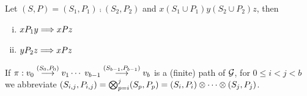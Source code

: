 \begin{lemma}\label{lem:P-lemma}
Let $(S,P) = (S_1,P_1)\comp (S_2,P_2)$ and $x (S_1 \cup P_1) y (S_2 \cup P_2) z$, then
\begin{enumerate}[i)]

\item
\label{lem:P-lemma-1} $x P_1 y \Longrightarrow x P z$

\item
\label{lem:P-lemma-2} $y P_2 z \Longrightarrow x P z$

\end{enumerate}
\end{lemma}

%

If $\pi: v_0 \stackrel{(S_0,P_0)}{\longrightarrow} v_1 \cdots \; v_{b-1} \stackrel{(S_{b-1},P_{b-1})}{\longrightarrow} v_{b}$ is a (finite) path of $\mathcal{G}$, for $0 \leq i < j < b$
we abbreviate $(S_{i,j}, P_{i,j}) = \bigotimes_{p = i}^{j} (S_p,P_p) = (S_i,P_i) \otimes \cdots \otimes (S_j,P_j)$. %



